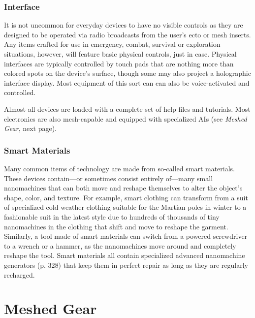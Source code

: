 \subsubsection{Interface}

It is not uncommon for everyday devices to have no 
visible controls as they are designed to be operated via 
radio broadcasts from the user's ecto or mesh inserts. 
Any items crafted for use in emergency, combat, survival
or exploration situations, however, will feature
basic physical controls, just in case. Physical interfaces 
are typically controlled by touch pads that are nothing
more than colored spots on the device's surface,
though some may also project a holographic interface 
display. Most equipment of this sort can can also be 
voice-activated and controlled.

Almost all devices are loaded with a complete set 
of help files and tutorials. Most electronics are also 
mesh-capable and equipped with specialized AIs (see 
\textit{Meshed Gear}, next page).

\subsubsection{Smart Materials}

Many common items of technology are made from 
so-called smart materials. These devices contain—or 
sometimes consist entirely of—many small nanomachines
that can both move and reshape themselves
to alter the object's shape, color, and texture. For 
example, smart clothing can transform from a suit of 
specialized cold weather clothing suitable for the Martian
poles in winter to a fashionable suit in the latest
style due to hundreds of thousands of tiny nanomachines
in the clothing that shift and move to reshape
the garment. Similarly, a tool made of smart materials 
can switch from a powered screwdriver to a wrench 
or a hammer, as the nanomachines move around and 
completely reshape the tool. Smart materials all contain
specialized advanced nanomachine generators (p.
328) that keep them in perfect repair as long as they 
are regularly recharged.

\section{Meshed Gear}

